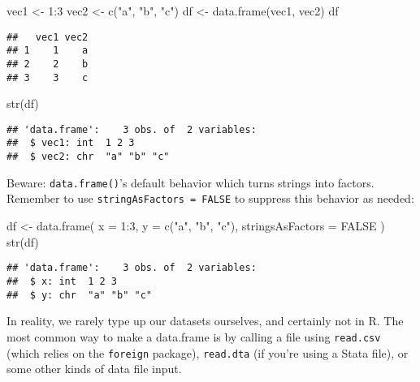 \documentclass[
]{book}
\newenvironment{Shaded}{\begin{snugshade}}{\end{snugshade}}
\newcommand{\AttributeTok}[1]{\textcolor[rgb]{0.77,0.63,0.00}{#1}}
\newcommand{\ConstantTok}[1]{\textcolor[rgb]{0.00,0.00,0.00}{#1}}
\newcommand{\DecValTok}[1]{\textcolor[rgb]{0.00,0.00,0.81}{#1}}
\newcommand{\FunctionTok}[1]{\textcolor[rgb]{0.00,0.00,0.00}{#1}}
\newcommand{\NormalTok}[1]{#1}
\newcommand{\OtherTok}[1]{\textcolor[rgb]{0.56,0.35,0.01}{#1}}
\newcommand{\SpecialCharTok}[1]{\textcolor[rgb]{0.00,0.00,0.00}{#1}}
\newcommand{\StringTok}[1]{\textcolor[rgb]{0.31,0.60,0.02}{#1}}
\begin{document}
\begin{Shaded}
\begin{Highlighting}[]
\NormalTok{vec1 }\OtherTok{\textless{}{-}} \DecValTok{1}\SpecialCharTok{:}\DecValTok{3}
\NormalTok{vec2 }\OtherTok{\textless{}{-}} \FunctionTok{c}\NormalTok{(}\StringTok{"a"}\NormalTok{, }\StringTok{"b"}\NormalTok{, }\StringTok{"c"}\NormalTok{)}
\NormalTok{df }\OtherTok{\textless{}{-}} \FunctionTok{data.frame}\NormalTok{(vec1, vec2)}
\NormalTok{df}
\end{Highlighting}
\end{Shaded}

\begin{verbatim}
##   vec1 vec2
## 1    1    a
## 2    2    b
## 3    3    c
\end{verbatim}

\begin{Shaded}
\begin{Highlighting}[]
\FunctionTok{str}\NormalTok{(df)}
\end{Highlighting}
\end{Shaded}

\begin{verbatim}
## 'data.frame':    3 obs. of  2 variables:
##  $ vec1: int  1 2 3
##  $ vec2: chr  "a" "b" "c"
\end{verbatim}

Beware: \texttt{data.frame()}'s default behavior which turns strings into factors. Remember to use \texttt{stringAsFactors\ =\ FALSE} to suppress this behavior as needed:

\begin{Shaded}
\begin{Highlighting}[]
\NormalTok{df }\OtherTok{\textless{}{-}} \FunctionTok{data.frame}\NormalTok{(}
  \AttributeTok{x =} \DecValTok{1}\SpecialCharTok{:}\DecValTok{3}\NormalTok{,}
  \AttributeTok{y =} \FunctionTok{c}\NormalTok{(}\StringTok{"a"}\NormalTok{, }\StringTok{"b"}\NormalTok{, }\StringTok{"c"}\NormalTok{),}
  \AttributeTok{stringsAsFactors =} \ConstantTok{FALSE}
\NormalTok{)}
\FunctionTok{str}\NormalTok{(df)}
\end{Highlighting}
\end{Shaded}

\begin{verbatim}
## 'data.frame':    3 obs. of  2 variables:
##  $ x: int  1 2 3
##  $ y: chr  "a" "b" "c"
\end{verbatim}

In reality, we rarely type up our datasets ourselves, and certainly not in R. The most common way to make a data.frame is by calling a file using \texttt{read.csv} (which relies on the \texttt{foreign} package), \texttt{read.dta} (if you're using a Stata file), or some other kinds of data file input.
\end{document}
